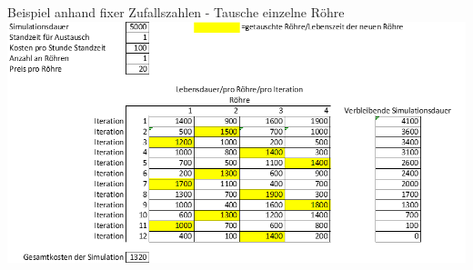 \begin{frame}[fragile]{Beispiel anhand fixer Zufallszahlen - Tausche einzelne Röhre}
	\centering
  	\includegraphics[scale=.5]{BSP20_Zufallszahlen_2.png}
\end{frame}





